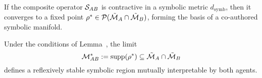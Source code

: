 \begin{lemma}
\label{lem:bk9_mutual_convergence_criterion}
If the composite operator \( \mathcal{S}_{AB} \) is contractive in a symbolic metric \( d_\text{symb} \), then it converges to a fixed point \( \rho^* \in \mathcal{P}(\tilde{\mathcal{M}}_A \cap \tilde{\mathcal{M}}_B) \), forming the basis of a co-authored symbolic manifold.
\end{lemma}
\begin{proposition}
\label{prop:bk9_emergence_of_shared_manifold}
Under the conditions of Lemma~, the limit
\[
\mathcal{M}_{AB}^* := \operatorname{supp}(\rho^*) \subseteq \tilde{\mathcal{M}}_A \cap \tilde{\mathcal{M}}_B
\]
defines a reflexively stable symbolic region mutually interpretable by both agents.
\end{proposition}

